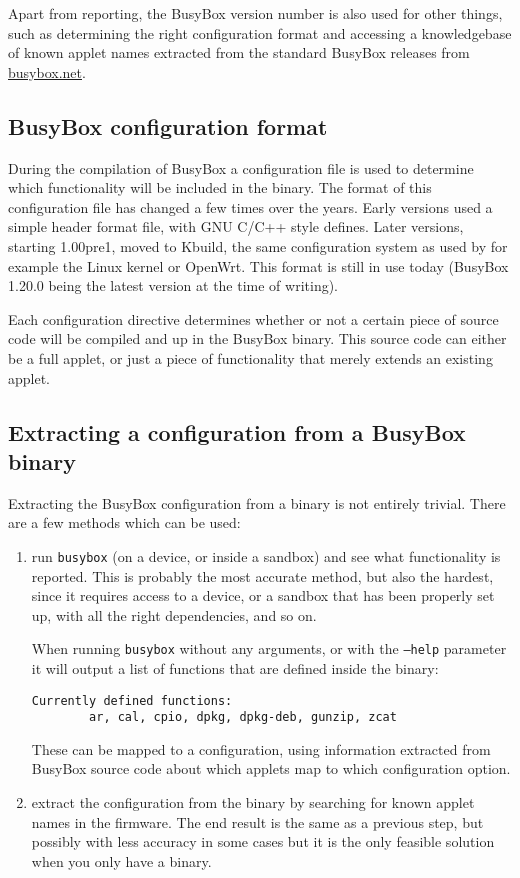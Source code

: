 \documentclass[10pt]{article}
\begin{document}
Apart from reporting, the BusyBox version number is also used for other
things, such as determining the right configuration format and accessing a
knowledgebase of known applet names extracted from the standard BusyBox
releases from \url{busybox.net}.

\subsection{BusyBox configuration format}

During the compilation of BusyBox a configuration file is used to determine
which functionality will be included in the binary. The format of this
configuration file has changed a few times over the years. Early versions used
a simple header format file, with GNU C/C++ style defines. Later versions,
starting 1.00pre1, moved to Kbuild, the same configuration system as used by
for example the Linux kernel or OpenWrt. This format is still in use today
(BusyBox 1.20.0 being the latest version at the time of writing).

Each configuration directive determines whether or not a certain piece of
source code will be compiled and up in the BusyBox binary. This source code can
either be a full applet, or just a piece of functionality that merely extends
an existing applet.

\subsection{Extracting a configuration from a BusyBox binary}

Extracting the BusyBox configuration from a binary is not entirely trivial.
There are a few methods which can be used:

\begin{enumerate}
\item run \texttt{busybox} (on a device, or inside a sandbox) and see what
functionality is reported. This is probably the most accurate method, but also
the hardest, since it requires access to a device, or a sandbox that has been
properly set up, with all the right dependencies, and so on.

When running \texttt{busybox} without any arguments, or with the \texttt{--help}
parameter it will output a list of functions that are defined inside the
binary:

\begin{verbatim}
Currently defined functions:
        ar, cal, cpio, dpkg, dpkg-deb, gunzip, zcat
\end{verbatim}

These can be mapped to a configuration, using information extracted from
BusyBox source code about which applets map to which configuration option.
\item extract the configuration from the binary by searching for known applet
names in the firmware. The end result is the same as a previous step, but
possibly with less accuracy in some cases but it is the only feasible solution
when you only have a binary.
\end{enumerate}
\end{document}
